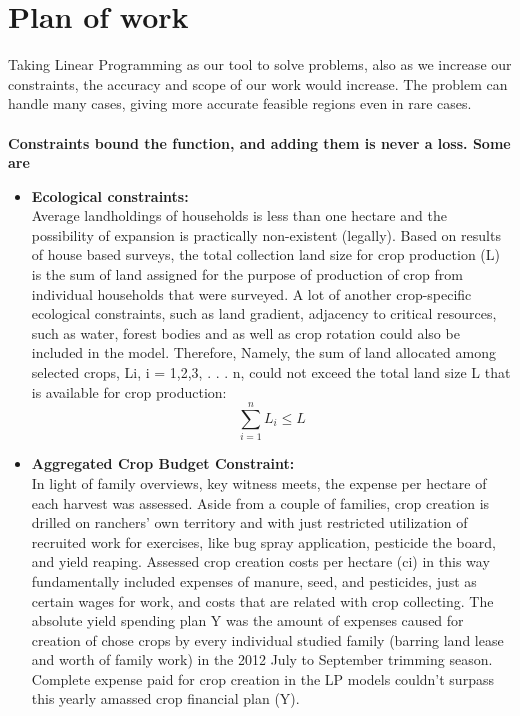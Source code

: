 \documentclass[conference]{IEEEtran}
\begin{document}
\section{Plan of work}
Taking Linear Programming as our tool to solve problems, also as we increase our constraints, the accuracy and scope of our work would increase. The problem can handle many cases, giving more accurate feasible regions even in rare cases.
\\\\
\textbf{Constraints bound the function, and adding them is never a loss. Some are}
\begin{itemize}
    \item \textbf{Ecological constraints:}\\ Average landholdings of households is less than one hectare and the possibility of expansion is practically non-existent (legally). Based on results of house based surveys, the total collection land size for crop production (L) is the sum of land assigned for the purpose of production of crop from individual households that were surveyed. A lot of another crop-specific ecological constraints, such as land gradient, adjacency to critical resources, such as water, forest bodies and as well as crop rotation could also be included in the model. Therefore, Namely, the sum of land allocated among selected crops, Li, i = 1,2,3, . . . n, could not exceed the total land size L that is available for crop production: \\
    \[ \sum_{i=1}^{n} L_{i} \leq L \]
    \item \textbf{Aggregated Crop Budget Constraint:}\\ In light of family overviews, key witness meets, the expense per hectare of each harvest was assessed. Aside from a couple of families, crop creation is drilled on ranchers' own territory and with just restricted utilization of recruited work for exercises, like bug spray application, pesticide the board, and yield reaping. Assessed crop creation costs per hectare (ci) in this way fundamentally included expenses of manure, seed, and pesticides, just as certain wages for work, and costs that are related with crop collecting. The absolute yield spending plan Y was the amount of expenses caused for creation of chose crops by every individual studied family (barring land lease and worth of family work) in the 2012 July to September trimming season. Complete expense paid for crop creation in the LP models couldn't surpass this yearly amassed crop financial plan (Y). \\

\end{itemize}
\end{document}
